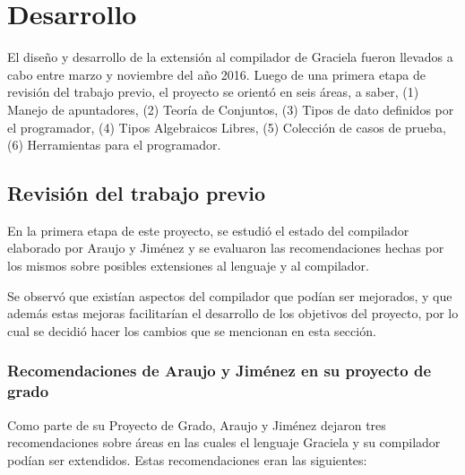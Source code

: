\chapter{Desarrollo}
\label{capitulo3}


El diseño y desarrollo de la extensión al compilador de Graciela fueron llevados
a cabo entre marzo y noviembre del año 2016. Luego de una primera etapa de
revisión del trabajo previo, el proyecto se orientó en seis áreas, a saber,
(1) Manejo de apuntadores, (2) Teoría de Conjuntos, (3) Tipos de dato definidos
por el programador, (4) Tipos Algebraicos Libres, (5) Colección de casos de 
prueba, (6) Herramientas para el programador.

\setcounter{section}{-1}
\section{Revisión del trabajo previo}

En la primera etapa de este proyecto, se estudió el estado del compilador
elaborado por Araujo y Jiménez y se evaluaron las recomendaciones hechas por los
mismos sobre posibles extensiones al lenguaje y al compilador.

Se observó que existían aspectos del compilador que podían ser mejorados, y que
además estas mejoras facilitarían el desarrollo de los objetivos del proyecto,
por lo cual se decidió hacer los cambios que se mencionan en esta sección.

\subsection{Recomendaciones de Araujo y Jiménez en su proyecto de grado}

Como parte de su Proyecto de Grado, Araujo y Jiménez dejaron tres
recomendaciones sobre áreas en las cuales el lenguaje Graciela y su compilador
podían ser extendidos. Estas recomendaciones eran las siguientes:

